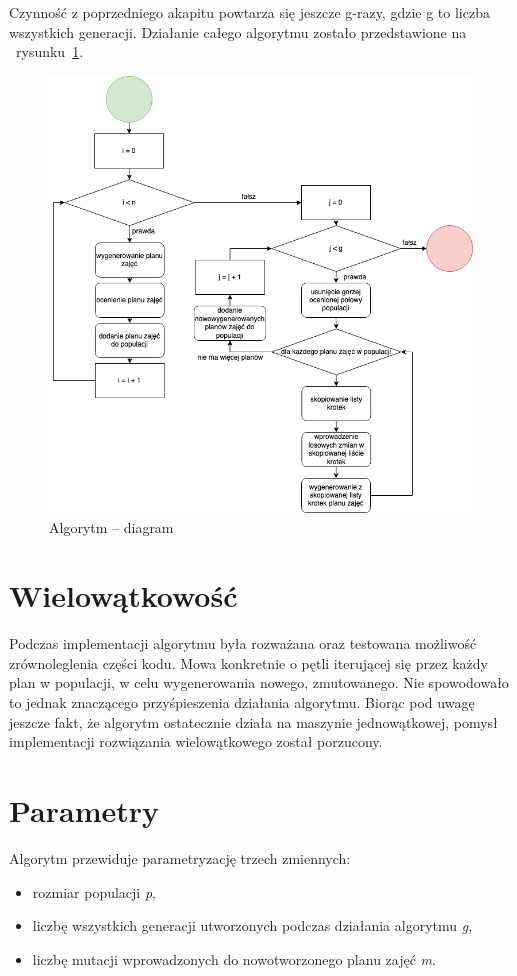     Czynność z poprzedniego akapitu powtarza się jeszcze g-razy, gdzie g to liczba wszystkich generacji. Działanie całego algorytmu zostało przedstawione na ~rysunku~\ref{rys:alf_flow}.


\begin{figure}[H]
\centering\includegraphics[width=\textwidth]{figures/alg_flow}
\caption{Algorytm -- diagram}\label{rys:alf_flow}
\end{figure}

\section{Wielowątkowość}

Podczas implementacji algorytmu była rozważana oraz testowana możliwość zrównoleglenia części kodu. Mowa konkretnie o pętli iterującej się przez każdy plan w populacji, w celu wygenerowania nowego, zmutowanego. Nie spowodowało to jednak znaczącego przyśpieszenia działania algorytmu. Biorąc pod uwagę jeszcze fakt, że algorytm ostatecznie działa na maszynie jednowątkowej, pomysł implementacji rozwiązania wielowątkowego został porzucony.


\section{Parametry}
Algorytm przewiduje parametryzację trzech zmiennych:
\begin{itemize}
	\item rozmiar populacji \textit{p},
	\item liczbę wszystkich generacji utworzonych podczas działania algorytmu \textit{g},
	\item liczbę mutacji wprowadzonych do nowotworzonego planu zajęć \textit{m}.
\end{itemize}

